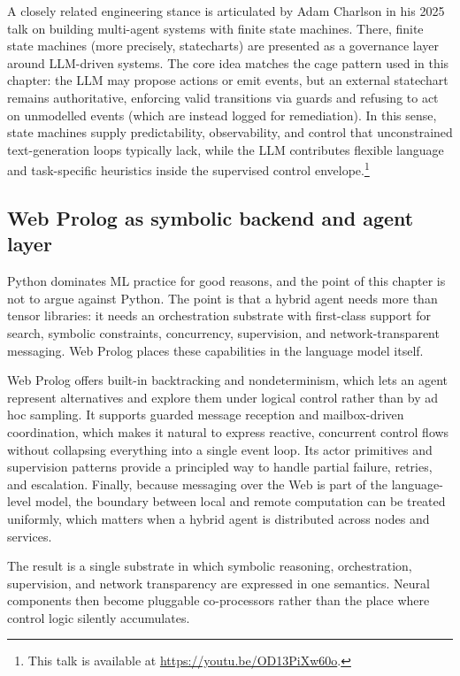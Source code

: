 A closely related engineering stance is articulated by Adam Charlson in his 2025 talk on building multi-agent systems with finite state machines. There, finite state machines (more precisely, statecharts) are presented as a governance layer around LLM-driven systems. The core idea matches the cage pattern used in this chapter: the LLM may propose actions or emit events, but an external statechart remains authoritative, enforcing valid transitions via guards and refusing to act on unmodelled events (which are instead logged for remediation). In this sense, state machines supply predictability, observability, and control that unconstrained text-generation loops typically lack, while the LLM contributes flexible language and task-specific heuristics inside the supervised control envelope.\footnote{This talk is available at \url{https://youtu.be/OD13PiXw60o}.}

\subsection{Web Prolog as symbolic backend and agent layer}
\label{sec:web-prolog-as-backend}

Python dominates ML practice for good reasons, and the point of this chapter is not to argue against Python. The point is that a hybrid agent needs more than tensor libraries: it needs an orchestration substrate with first-class support for search, symbolic constraints, concurrency, supervision, and network-transparent messaging. Web Prolog places these capabilities in the language model itself.

Web Prolog offers built-in backtracking and nondeterminism, which lets an agent represent alternatives and explore them under logical control rather than by ad hoc sampling. It supports guarded message reception and mailbox-driven coordination, which makes it natural to express reactive, concurrent control flows without collapsing everything into a single event loop. Its actor primitives and supervision patterns provide a principled way to handle partial failure, retries, and escalation. Finally, because messaging over the Web is part of the language-level model, the boundary between local and remote computation can be treated uniformly, which matters when a hybrid agent is distributed across nodes and services.

The result is a single substrate in which symbolic reasoning, orchestration, supervision, and network transparency are expressed in one semantics. Neural components then become pluggable co-processors rather than the place where control logic silently accumulates.

